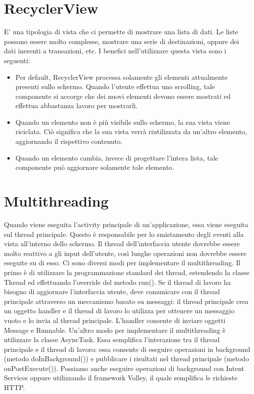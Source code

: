 \section{RecyclerView}
E' una tipologia di vista che ci permette di mostrare una lista di dati. Le liste possono essere molto complesse, mostrare una serie di destinazioni, oppure dei dati inerenti a transazioni, etc. I benefici nell'utilizzare questa vista sono i seguenti:
\begin{itemize}
\item Per default, RecyclerView processa solamente gli elementi attualmente presenti sullo schermo. Quando l'utente effettua uno scrolling, tale componente si accorge che dei nuovi elementi devono essere mostrati ed effettua abbastanza lavoro per mostrarli.
\item Quando un elemento non è più visibile sullo schermo, la sua vista viene riciclata. Ciò significa che la sua vista verrà riutilizzata da un'altro elemento, aggiornando il rispettivo contenuto.
\item Quando un elemento cambia, invece di progettare l'intera lista, tale componente può aggiornare solamente tale elemento.
\end{itemize}
\section{Multithreading}
Quando viene eseguita l'activity principale di un'applicazione, essa viene eseguita sul thread principale. Questo è responsabile per lo smistamento degli eventi alla vista all'interno dello schermo. Il thread dell'interfaccia utente dovrebbe essere molto reattivo a gli input dell'utente, così lunghe operazioni non dovrebbe essere eseguite su di esso. Ci sono diversi modi per implementare il multithreading. Il primo è di utilizzare la programmazione standard dei thread, estendendo la classe Thread ed effettuando l'override del metodo run(). Se il thread di lavoro ha bisogno di aggiornare l'interfaccia utente, deve comunicare con il thread principale attraverso un meccanismo basato su messaggi: il thread principale crea un oggetto handler e il thread di lavoro lo utilizza per ottenere un messaggio vuoto e lo invia al thread principale. L'handler consente di inviare oggetti Message e Runnable. Un'altro modo per implementare il multithreading è utilizzare la classe AsyncTask. Essa semplifica l'interazione tra il thread principale e il thread di lavoro: essa consente di eseguire operazioni in background (metodo doInBackground()) e pubblicare i risultati nel thread principale (metodo onPostExecute()). Possiamo anche eseguire operazioni di background con Intent Services oppure utilizzando il framework Volley, il quale semplifica le richieste HTTP.
